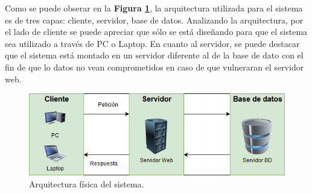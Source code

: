 Como se puede obserar en la \textbf{Figura \ref{fig: Arquitectura_Fisica}}, la arquitectura utilizada para el sistema es de tres capas: cliente, servidor, base de datos. Analizando la arquitectura, por el lado de cliente se puede apreciar que sólo se está diseñando para que el sistema sea utilizado a través de PC o Laptop. En cuanto al servidor, se puede destacar que el sistema está montado en un servidor diferente al de la base de dato con el fin de que lo datos no vean comprometidos en caso de que vulneraran el servidor web.

\begin{figure}[htb]
    \includegraphics[width=\textwidth]{Imagenes/Arquitectura_Fisica.png}
    \caption{\label{fig: Arquitectura_Fisica}Arquitectura física del sistema.}
\end{figure}